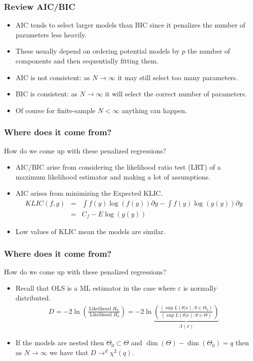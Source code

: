 \documentclass[xcolor=pdftex,dvipsnames,table,mathserif,aspectratio=169]{beamer}
\begin{document}
\begin{frame}
\frametitle{Review AIC/BIC}
\begin{itemize}
\item AIC tends to select larger models than BIC since it penalizes the number of parameters less heavily.
\item These usually depend on ordering potential models by $p$ the number of components and then sequentially fitting them.
\item AIC is not consistent: as $N \rightarrow \infty$ it may still select too many parameters.
\item BIC is consistent: as $N \rightarrow \infty$ it will select the correct number of parameters.
\item Of course for finite-sample $N < \infty$ anything can happen.
\end{itemize}
\end{frame}

\begin{frame}
\frametitle{Where does it come from?}
How do we come up with these penalized regressions?
\begin{itemize}
\item AIC/BIC arise from considering the likelihood ratio test (LRT) of a maximum likelihood estimator and making a lot of assumptions.
\item AIC arises from minimizing the Expected KLIC.
\begin{eqnarray*}
KLIC(f,g) &=& \int  f(y) \log(f(y)) \partial y - \int  f(y) \log(g(y)) \partial y  \\
&=& C_f - E  \log(g(y))
\end{eqnarray*}
\item Low values of KLIC mean the models are similar.
\end{itemize}
\end{frame}

\begin{frame}
\frametitle{Where does it come from?}
How do we come up with these penalized regressions?
\begin{itemize}
\item Recall that OLS is a ML estimator in the case where $\varepsilon$ is normally distributed.
\begin{eqnarray*}
D = - 2 \ln \left (\frac{\mbox{Likelihood  } H_0}{\mbox{ Likelihood  }H_a} \right) = -2 \ln \underbrace{\left(\frac{(\sup L(\theta | x) : \theta \in \Theta_0)}{(\sup L(\theta | x) : \theta \in \Theta)}\right)}_{\Lambda(x)}
\end{eqnarray*}
\item If the models are \alert{nested} then $\Theta_0 \subset \Theta$ and $\dim(\Theta) -\dim(\Theta_0) = q$ then as $N\rightarrow \infty$ we have that $D \rightarrow^d \chi^2(q)$.
\end{itemize}
\end{frame}
\end{document}
